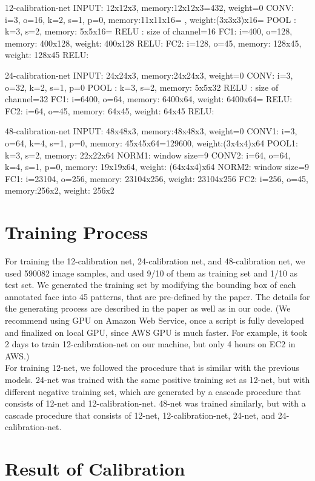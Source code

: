 \documentclass[twoside]{article}
\theoremstyle{definition}
\theoremstyle{definition}
\theoremstyle{remark}
\begin{document}
12-calibration-net
INPUT: 12x12x3, memory:12x12x3=432, weight=0
CONV: i=3, o=16, k=2, s=1, p=0, memory:11x11x16= , weight:(3x3x3)x16=
POOL : k=3, s=2, memory: 5x5x16=  
RELU : size of channel=16
FC1: i=400, o=128, memory: 400x128, weight: 400x128
RELU:
FC2: i=128, o=45, memory: 128x45, weight: 128x45
RELU: 

24-calibration-net
INPUT: 24x24x3, memory:24x24x3, weight=0
CONV: i=3, o=32, k=2, s=1, p=0
POOL : k=3, s=2, memory: 5x5x32  
RELU : size of channel=32
FC1: i=6400, o=64, memory: 6400x64, weight: 6400x64=
RELU:
FC2: i=64, o=45, memory: 64x45, weight: 64x45
RELU: 

48-calibration-net
INPUT: 48x48x3, memory:48x48x3, weight=0
CONV1: i=3, o=64, k=4, s=1, p=0, memory: 45x45x64=129600, weight:(3x4x4)x64
POOL1: k=3, s=2, memory: 22x22x64
NORM1: window size=9
CONV2: i=64, o=64, k=4, s=1, p=0, memory: 19x19x64, weight: (64x4x4)x64
NORM2: window size=9
FC1: i=23104, o=256, memory: 23104x256, weight: 23104x256
FC2: i=256, o=45, memory:256x2, weight: 256x2

\section{Training Process}

For training the 12-calibration net, 24-calibration net, and 48-calibration net, we used 590082 image samples, and used 9/10 of them as training set and 1/10 as test set. We generated the training set by modifying the bounding box of each annotated face into 45 patterns, that are pre-defined by the paper. The details for the generating process are described in the paper as well as in our code. (We recommend using GPU on Amazon Web Service, once a script is fully developed and finalized on local GPU, since AWS GPU is much faster. For example, it took 2 days to train 12-calibration-net on our machine, but only 4 hours on EC2 in AWS.)  \\

For training 12-net, we followed the procedure that is similar with the previous models. 
24-net was trained with the same positive training set as 12-net, but with different negative training set, which are generated by a cascade procedure that consists of 12-net and 12-calibration-net. 48-net was trained similarly, but with a cascade procedure that consists of 12-net, 12-calibration-net, 24-net, and 24-calibration-net. 

\section{Result of Calibration}
\end{document}
